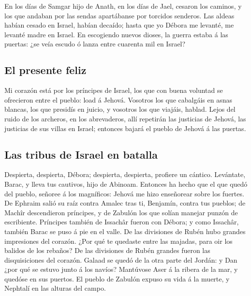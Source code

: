  En los días de Samgar hijo de Anath, en los días de Jael,
cesaron los caminos, y los que andaban por las sendas apartábanse por
torcidos senderos.  Las aldeas habían cesado en Israel,
habían decaído; hasta que yo Débora me levanté, me levanté madre en
Israel.  En escogiendo nuevos dioses, la guerra estaba á
las puertas: ¿se veía escudo ó lanza entre cuarenta mil en Israel?

\hypertarget{el-presente-feliz}{%
\subsection{El presente feliz}\label{el-presente-feliz}}

 Mi corazón está por los príncipes de Israel, los que con
buena voluntad se ofrecieron entre el pueblo: load á Jehová.
 Vosotros los que cabalgáis en asnas blancas, los que
presidís en juicio, y vosotros los que viajáis, hablad. 
Lejos del ruido de los archeros, en los abrevaderos, allí repetirán las
justicias de Jehová, las justicias de sus villas en Israel; entonces
bajará el pueblo de Jehová á las puertas.

\hypertarget{las-tribus-de-israel-en-batalla}{%
\subsection{Las tribus de Israel en
batalla}\label{las-tribus-de-israel-en-batalla}}

 Despierta, despierta, Débora; despierta, despierta,
profiere un cántico. Levántate, Barac, y lleva tus cautivos, hijo de
Abinoam.  Entonces ha hecho que el que quedó del pueblo,
señoree á los magníficos: Jehová me hizo enseñorear sobre los fuertes.
 De Ephraim salió su raíz contra Amalec tras ti,
Benjamín, contra tus pueblos; de Machîr descendieron príncipes, y de
Zabulón los que solían manejar punzón de escribiente. 
Príncipes también de Issachâr fueron con Débora; y como Issachâr,
también Barac se puso á pie en el valle. De las divisiones de Rubén hubo
grandes impresiones del corazón.  ¿Por qué te quedaste
entre las majadas, para oir los balidos de los rebaños? De las
divisiones de Rubén grandes fueron las disquisiciones del corazón.
 Galaad se quedó de la otra parte del Jordán: y Dan ¿por
qué se estuvo junto á los navíos? Mantúvose Aser á la ribera de la mar,
y quedóse en sus puertos.  El pueblo de Zabulón expuso su
vida á la muerte, y Nephtalí en las alturas del campo.

